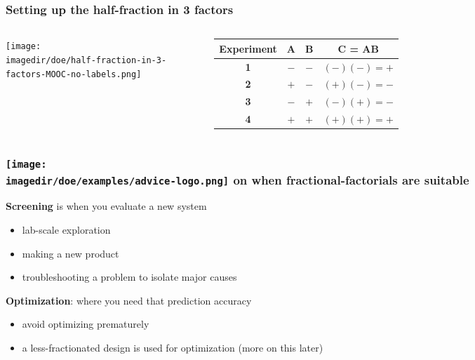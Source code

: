 \documentclass[handout,11pt,aspectratio=169,mathserif]{beamer}
\begin{document}
\begin{frame}\frametitle{Setting up the half-fraction in 3 factors}
	\begin{columns}
			\begin{center}
				\texttt{[image: \\imagedir/doe/half-fraction-in-3-factors-MOOC-no-labels.png]}
			\end{center}
			
			\begin{tabulary}{\linewidth}{|c||c|c|c|}\hline 
				\textsf{\relax Experiment } & \textbf{\relax A } & \textbf{\relax B } & \textbf{\relax C = AB } \\
				\hline \textbf{1} & \(-\) & \(-\) & \((-)(-) = +\) \\
				\hline \textbf{2} & \(+\) & \(-\) & \((+)(-) = -\) \\
				\hline \textbf{3} & \(-\) & \(+\) & \((-)(+) = -\) \\
				\hline \textbf{4} & \(+\) & \(+\) & \((+)(+) = +\) \\
				\hline
			\end{tabulary}
			
	\end{columns}
\end{frame}

\begin{frame}\frametitle{\texttt{[image: \\imagedir/doe/examples/advice-logo.png]} on when fractional-factorials are suitable}
	\textbf{Screening} is when you evaluate a new system
	\begin{itemize}
		\item	lab-scale exploration
		\item	making a new product
		\item	troubleshooting a problem to isolate major causes
	\end{itemize}
	
	\pause
	\vspace{1cm}
	\textbf{Optimization}: where you need that prediction accuracy
	\begin{itemize}
		\item	avoid optimizing prematurely
		\item	a less-fractionated design is used for optimization (more on this later)
	\end{itemize}
	
\end{frame}
\end{document}
